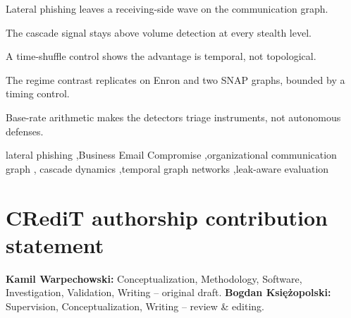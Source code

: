 \documentclass[a4paper,fleqn]{cas-sc}
\begin{document}
\begin{abstract}
The methodological contribution is a leak-aware evaluation protocol---matched design, causal time-shuffle
control, inductive organization split, label-noise audit---with explicit base-rate accounting: at a
realistic prevalence each detected attack comes with hundreds of false alarms, so detectors of this class are
triage instruments, not autonomous defenses. The work reframes lateral phishing as a measurable property of
the communication graph: measurable, though not yet operationally solved.
\end{abstract}

\begin{highlights}
\item Lateral phishing leaves a receiving-side wave on the communication graph.
\item The cascade signal stays above volume detection at every stealth level.
\item A time-shuffle control shows the advantage is temporal, not topological.
\item The regime contrast replicates on Enron and two SNAP graphs, bounded by a timing control.
\item Base-rate arithmetic makes the detectors triage instruments, not autonomous defenses.
\end{highlights}

\begin{keywords}
lateral phishing \sep Business Email Compromise \sep organizational communication graph \sep
cascade dynamics \sep temporal graph networks \sep leak-aware evaluation
\end{keywords}

\maketitle









\section*{CRediT authorship contribution statement}
\textbf{Kamil Warpechowski:} Conceptualization, Methodology, Software, Investigation, Validation,
Writing -- original draft. \textbf{Bogdan Ksi{\k{e}}{\.z}opolski:} Supervision, Conceptualization,
Writing -- review \& editing.
\end{document}
